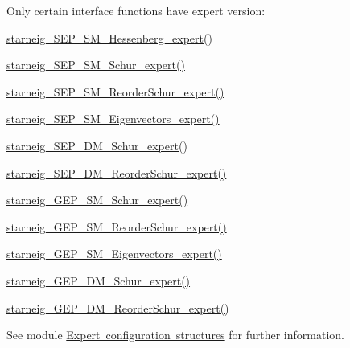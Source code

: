 Only certain interface functions have expert version\+:


\begin{DoxyItemize}
\item \mbox{\hyperlink{group__starneig__sm__sep_gaf8e83526564ad7700618fe337f775d15}{starneig\+\_\+\+S\+E\+P\+\_\+\+S\+M\+\_\+\+Hessenberg\+\_\+expert()}}
\item \mbox{\hyperlink{group__starneig__sm__sep_ga897a9440980daa8cb3f99fbfed97767e}{starneig\+\_\+\+S\+E\+P\+\_\+\+S\+M\+\_\+\+Schur\+\_\+expert()}}
\item \mbox{\hyperlink{group__starneig__sm__sep_ga2ec9742ad00d318ed17e914e3bc8b837}{starneig\+\_\+\+S\+E\+P\+\_\+\+S\+M\+\_\+\+Reorder\+Schur\+\_\+expert()}}
\item \mbox{\hyperlink{group__starneig__sm__sep_ga9c415f29dc508a6575614f3ce04ba1f1}{starneig\+\_\+\+S\+E\+P\+\_\+\+S\+M\+\_\+\+Eigenvectors\+\_\+expert()}}
\item \mbox{\hyperlink{group__starneig__dm__sep_ga27d11b70381402e94511fff227cde570}{starneig\+\_\+\+S\+E\+P\+\_\+\+D\+M\+\_\+\+Schur\+\_\+expert()}}
\item \mbox{\hyperlink{group__starneig__dm__sep_ga3d9ce53220c7da8f236a33a155484a31}{starneig\+\_\+\+S\+E\+P\+\_\+\+D\+M\+\_\+\+Reorder\+Schur\+\_\+expert()}}
\item \mbox{\hyperlink{group__starneig__sm__gep_gabaf294a5fc2687264c10192b3aad4751}{starneig\+\_\+\+G\+E\+P\+\_\+\+S\+M\+\_\+\+Schur\+\_\+expert()}}
\item \mbox{\hyperlink{group__starneig__sm__gep_ga6c9ee2e87882b9c2183f45b4d6ca60a5}{starneig\+\_\+\+G\+E\+P\+\_\+\+S\+M\+\_\+\+Reorder\+Schur\+\_\+expert()}}
\item \mbox{\hyperlink{group__starneig__sm__gep_gaf1f4649a8fb390967888f38e2e169b9b}{starneig\+\_\+\+G\+E\+P\+\_\+\+S\+M\+\_\+\+Eigenvectors\+\_\+expert()}}
\item \mbox{\hyperlink{group__starneig__dm__gep_ga84fee6edfb798ac35fdbc24d40842f20}{starneig\+\_\+\+G\+E\+P\+\_\+\+D\+M\+\_\+\+Schur\+\_\+expert()}}
\item \mbox{\hyperlink{group__starneig__dm__gep_ga05453bd93f99bb671f48f049f4c9de65}{starneig\+\_\+\+G\+E\+P\+\_\+\+D\+M\+\_\+\+Reorder\+Schur\+\_\+expert()}}
\end{DoxyItemize}

See module \mbox{\hyperlink{group__starneig__ex__conf}{Expert configuration structures}} for further information. 
